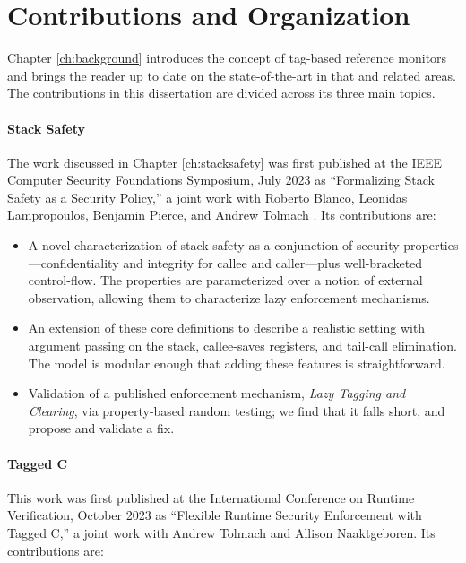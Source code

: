 \documentclass{report}
\begin{document}
\section{Contributions and Organization}

Chapter \ref{ch:background} introduces the concept of tag-based reference monitors
and brings the reader up to date on the state-of-the-art in that and related areas.
The contributions in this dissertation are divided across its three main topics.

\paragraph{Stack Safety}

The work discussed in Chapter \ref{ch:stacksafety} was first published at the
IEEE Computer Security Foundations Symposium, July 2023 as
``Formalizing Stack Safety as a Security Policy,'' a
joint work with Roberto Blanco, Leonidas Lampropoulos, Benjamin Pierce, and Andrew Tolmach
\cite{Anderson23:StackSafety}. Its contributions are:

\begin{itemize}
\item A novel characterization of stack safety as a conjunction
  of security properties---confidentiality and integrity for callee
  and caller---plus well-bracketed control-flow.
  The properties are parameterized over a notion of
  external observation, allowing them to characterize lazy enforcement
  mechanisms.
\item An extension of these core definitions to
  describe a realistic setting with argument passing on the stack,
  callee-saves registers, and tail-call elimination. The model is
  modular enough that adding these features is straightforward.
\item Validation of a published enforcement mechanism,
  \emph{Lazy Tagging and Clearing}, via property-based random testing; we find that
  it falls short, and propose and validate a fix.
\end{itemize}

\paragraph{Tagged C}

This work was first published at the International Conference on Runtime Verification,
October 2023 as ``Flexible Runtime Security Enforcement with Tagged C,'' a joint work
with Andrew Tolmach and Allison Naaktgeboren. Its contributions are:
 
\end{document}
